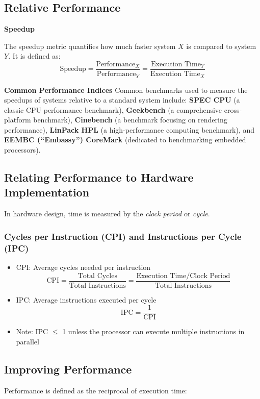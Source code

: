 \subsection{Relative Performance}
\textbf{Speedup}

The speedup metric quantifies how much faster system $X$ is compared to system $Y$. It is defined as:
\[
\text{Speedup} = \frac{\text{Performance}_X}{\text{Performance}_Y} = \frac{\text{Execution Time}_Y}{\text{Execution Time}_X}
\]

\textbf{Common Performance Indices}
Common benchmarks used to measure the speedups of systems relative to a standard system include: \newline
\textbf{SPEC CPU} (a classic CPU performance benchmark), \textbf{Geekbench} (a comprehensive cross-platform benchmark), \textbf{Cinebench} (a benchmark focusing on rendering performance), \textbf{LinPack HPL} (a high-performance computing benchmark), and \textbf{EEMBC (``Embassy'') CoreMark} (dedicated to benchmarking embedded processors).

\subsection{Relating Performance to Hardware Implementation}
In hardware design, time is measured by the \textit{clock period} or \textit{cycle}.

\subsubsection{Cycles per Instruction (CPI) and Instructions per Cycle (IPC)}
\begin{itemize}
    \item CPI: Average cycles needed per instruction
    \[
    \text{CPI} = \frac{\text{Total Cycles}}{\text{Total Instructions}} = \frac{\text{Execution Time}/\text{Clock Period}}{\text{Total Instructions}}
    \]
    \item IPC: Average instructions executed per cycle
    \[
    \text{IPC} = \frac{1}{\text{CPI}}
    \]
    \item Note: IPC $\leq$ 1 unless the processor can execute multiple instructions in parallel
\end{itemize}

\subsection{Improving Performance}
Performance is defined as the reciprocal of execution time:


